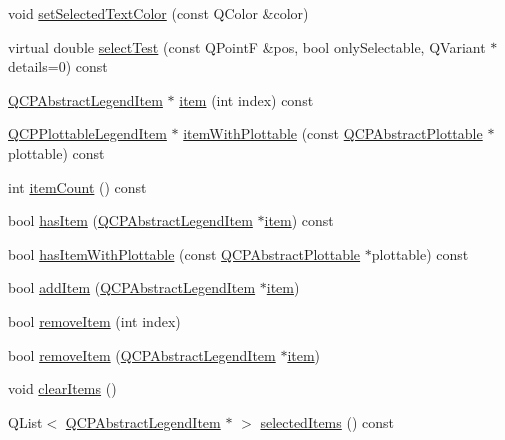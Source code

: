 \begin{DoxyCompactItemize}
\item 
void \hyperlink{class_q_c_p_legend_a7674dfc7a1f30e1abd1018c0ed45e0bc}{set\+Selected\+Text\+Color} (const Q\+Color \&color)
\item 
virtual double \hyperlink{class_q_c_p_legend_aa3892801051bc7b985e003576df844db}{select\+Test} (const Q\+Point\+F \&pos, bool only\+Selectable, Q\+Variant $\ast$details=0) const 
\item 
\hyperlink{class_q_c_p_abstract_legend_item}{Q\+C\+P\+Abstract\+Legend\+Item} $\ast$ \hyperlink{class_q_c_p_legend_a454272d7094437beb3278a2294006da5}{item} (int index) const 
\item 
\hyperlink{class_q_c_p_plottable_legend_item}{Q\+C\+P\+Plottable\+Legend\+Item} $\ast$ \hyperlink{class_q_c_p_legend_a5ee80cf83f65e3b6dd386942ee3cc1ee}{item\+With\+Plottable} (const \hyperlink{class_q_c_p_abstract_plottable}{Q\+C\+P\+Abstract\+Plottable} $\ast$plottable) const 
\item 
int \hyperlink{class_q_c_p_legend_a198228e9cdc78d3a3c306fa6763d0404}{item\+Count} () const 
\item 
bool \hyperlink{class_q_c_p_legend_a380dd19eb631592e1ebb9b24cc5b398a}{has\+Item} (\hyperlink{class_q_c_p_abstract_legend_item}{Q\+C\+P\+Abstract\+Legend\+Item} $\ast$\hyperlink{class_q_c_p_legend_a454272d7094437beb3278a2294006da5}{item}) const 
\item 
bool \hyperlink{class_q_c_p_legend_a2eb1d24bdf5658e64962a656303fd61a}{has\+Item\+With\+Plottable} (const \hyperlink{class_q_c_p_abstract_plottable}{Q\+C\+P\+Abstract\+Plottable} $\ast$plottable) const 
\item 
bool \hyperlink{class_q_c_p_legend_a3ab274de52d2951faea45a6d975e6b3f}{add\+Item} (\hyperlink{class_q_c_p_abstract_legend_item}{Q\+C\+P\+Abstract\+Legend\+Item} $\ast$\hyperlink{class_q_c_p_legend_a454272d7094437beb3278a2294006da5}{item})
\item 
bool \hyperlink{class_q_c_p_legend_ac91595c3eaa746fe6321d2eb952c63bb}{remove\+Item} (int index)
\item 
bool \hyperlink{class_q_c_p_legend_a2aea4ec6da2d454dd0b241a254d65082}{remove\+Item} (\hyperlink{class_q_c_p_abstract_legend_item}{Q\+C\+P\+Abstract\+Legend\+Item} $\ast$\hyperlink{class_q_c_p_legend_a454272d7094437beb3278a2294006da5}{item})
\item 
void \hyperlink{class_q_c_p_legend_a24795c7250eb5214fcea16b7217b4dfb}{clear\+Items} ()
\item 
Q\+List$<$ \hyperlink{class_q_c_p_abstract_legend_item}{Q\+C\+P\+Abstract\+Legend\+Item} $\ast$ $>$ \hyperlink{class_q_c_p_legend_ac93eaf236e911d67aa8b88942ef45c5e}{selected\+Items} () const 
\end{DoxyCompactItemize}
